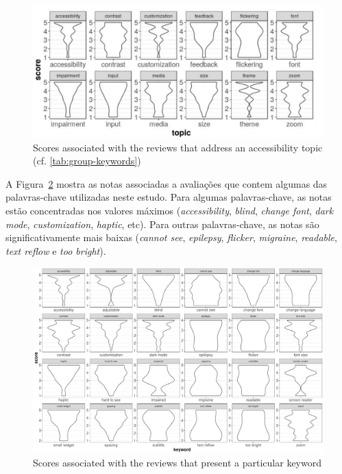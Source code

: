  \begin{figure}[!htb]
 \centering
\includegraphics[scale=0.57]{imagens/score-themes-adapt.pdf}
\caption{Scores associated with the reviews that address an accessibility topic (cf. \autoref{tab:group-keywords})}
\label{fig:scoresthemes}
\end{figure}

A Figura~\ref{fig:scoreskeys} mostra as notas associadas a avaliações que contem algumas das  palavras-chave utilizadas neste estudo. 
Para algumas palavras-chave, as notas estão concentradas nos valores máximos (\textit{accessibility}, \textit{blind}, \textit{change font}, \textit{dark mode}, \textit{customization}, \textit{haptic}, etc).
Para outras palavras-chave, as notas são significativamente mais baixas (\textit{cannot see}, \textit{epilepsy}, \textit{flicker}, \textit{migraine}, \textit{readable}, \textit{text reflow} e \textit{too bright}). 

 \begin{figure}[!htb]
 \centering
\includegraphics[scale=0.42]{imagens/keywords-scores.pdf}
\caption{Scores associated with the reviews that present a particular keyword}
\label{fig:scoreskeys}
\end{figure}

